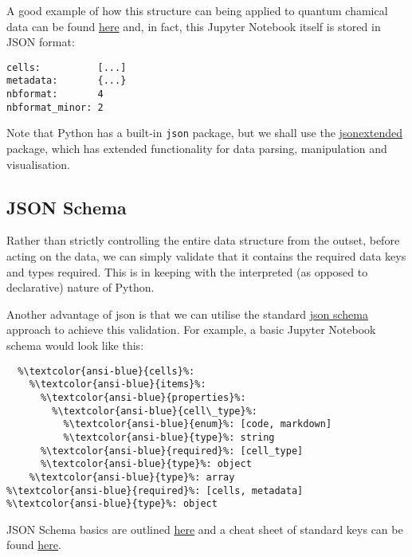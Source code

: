 \documentclass[10pt,parskip=half,
	toc=sectionentrywithdots,
	bibliography=totocnumbered,
	captions=tableheading,numbers=noendperiod]{scrartcl}
\begin{document}
A good example of how this structure can being applied to quantum
chamical data can be found
\href{https://github.com/MolSSI/QC_JSON_Schema}{here} and, in fact, this
Jupyter Notebook itself is stored in JSON format:

\begin{lstlisting}[language={},postbreak={},numbers=none,xrightmargin=7pt,belowskip=5pt,aboveskip=5pt,breakindent=0pt]
cells:          [...]
metadata:       {...}
nbformat:       4
nbformat_minor: 2

\end{lstlisting}

Note that Python has a built-in \texttt{json} package, but we shall use
the \href{https://github.com/chrisjsewell/jsonextended}{jsonextended}
package, which has extended functionality for data parsing, manipulation
and visualisation.

\subsection{JSON Schema}\label{json-schema}

Rather than strictly controlling the entire data structure from the
outset, before acting on the data, we can simply validate that it
contains the required data keys and types required. This is in keeping
with the interpreted (as opposed to declarative) nature of Python.

Another advantage of json is that we can utilise the standard
\href{http://json-schema.org/}{json schema} approach to achieve this
validation. For example, a basic Jupyter Notebook schema would look like
this:

\begin{lstlisting}[language={},postbreak={},numbers=none,xrightmargin=7pt,belowskip=5pt,aboveskip=5pt,breakindent=0pt,escapechar=\%]
%\textcolor{ansi-blue}{properties}%: 
  %\textcolor{ansi-blue}{cells}%: 
    %\textcolor{ansi-blue}{items}%: 
      %\textcolor{ansi-blue}{properties}%: 
        %\textcolor{ansi-blue}{cell\_type}%: 
          %\textcolor{ansi-blue}{enum}%: [code, markdown]
          %\textcolor{ansi-blue}{type}%: string
      %\textcolor{ansi-blue}{required}%: [cell_type]
      %\textcolor{ansi-blue}{type}%: object
    %\textcolor{ansi-blue}{type}%: array
%\textcolor{ansi-blue}{required}%: [cells, metadata]
%\textcolor{ansi-blue}{type}%: object

\end{lstlisting}

JSON Schema basics are outlined
\href{https://spacetelescope.github.io/understanding-json-schema/basics.html}{here}
and a cheat sheet of standard keys can be found
\href{http://forivall.com/json-schema-cheatsheet/}{here}.
\end{document}
